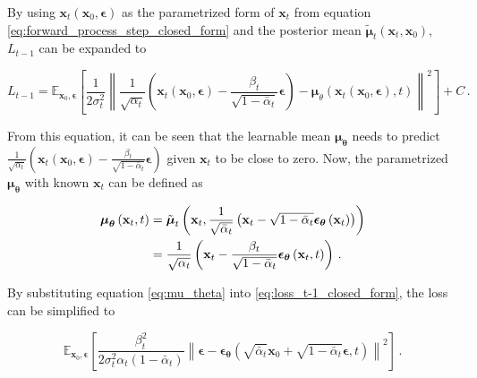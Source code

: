 By using $\mathbf{x}_t(\mathbf{x}_0,\boldsymbol{\epsilon})$ as the parametrized form of $\mathbf{x}_t$ from equation \ref{eq:forward_process_step_closed_form} and the posterior mean $\tilde{\boldsymbol{\mu}}_t\left(\mathbf{x}_t, \mathbf{x}_0\right)$, $L_{t-1}$ can be expanded to

\begin{equation}
L_{t-1} = \mathbb{E}_{\mathbf{x}_0, \boldsymbol{\epsilon}}\left[\frac{1}{2 \sigma_t^2}\left\|\frac{1}{\sqrt{\alpha_t}}\left(\mathbf{x}_t\left(\mathbf{x}_0, \boldsymbol{\epsilon}\right)-\frac{\beta_t}{\sqrt{1-\bar{\alpha}_t}} \boldsymbol{\epsilon}\right)-\boldsymbol{\mu}_\theta\left(\mathbf{x}_t\left(\mathbf{x}_0, \boldsymbol{\epsilon}\right), t\right)\right\|^2\right] + C \,.
\label{eq:loss_t-1_closed_form}
\end{equation}

From this equation, it can be seen that the learnable mean $\boldsymbol{\mu}_{\boldsymbol{\theta}}$ needs to predict \\ $\frac{1}{\sqrt{\alpha_t}}\left(\mathbf{x}_t\left(\mathbf{x}_0, \boldsymbol{\epsilon}\right)-\frac{\beta_t}{\sqrt{1-\bar{\alpha}_t}} \boldsymbol{\epsilon}\right)$ given $\mathbf{x}_t$ to be close to zero. Now, the parametrized $\boldsymbol{\mu}_{\boldsymbol{\theta}}$ with known $\mathbf{x}_t$ can be defined as

\begin{align}
\boldsymbol{\mu}_{\boldsymbol{\theta}}\left(\mathbf{x}_t, t\right) 
&= \tilde{\boldsymbol{\mu}}_t\left(\mathbf{x}_t, \frac{1}{\sqrt{\bar{\alpha}_t}}\left(\mathbf{x}_t-\sqrt{1-\bar{\alpha}_t} \boldsymbol{\epsilon}_{\boldsymbol{\theta}}\left(\mathbf{x}_t\right)\right)\right) \notag \\
&= \frac{1}{\sqrt{\alpha_t}}\left(\mathbf{x}_t-\frac{\beta_t}{\sqrt{1-\bar{\alpha}_t}} \boldsymbol{\epsilon}_{\boldsymbol{\theta}}\left(\mathbf{x}_t, t\right)\right) \,.
\label{eq:mu_theta}
\end{align}

By substituting equation \ref{eq:mu_theta} into \ref{eq:loss_t-1_closed_form}, the loss can be simplified to

\begin{equation}
\mathbb{E}_{\mathbf{x}_0, \boldsymbol{\epsilon}}\left[\frac{\beta_t^2}{2 \sigma_t^2 \alpha_t\left(1-\bar{\alpha}_t\right)}\left\|\boldsymbol{\epsilon}-\boldsymbol{\epsilon}_{\boldsymbol{\theta}}\left(\sqrt{\bar{\alpha}_t} \mathbf{x}_0+\sqrt{1-\bar{\alpha}_t} \boldsymbol{\epsilon}, t\right)\right\|^2\right] \,.
\end{equation}

